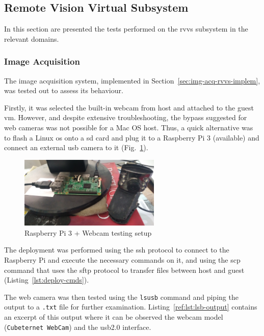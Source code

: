 \subsection{Remote Vision Virtual Subsystem}%
\label{sec:remote-visi-subsyst-testing}
In this section are presented the tests performed on the \gls{rvvs} subsystem in
the relevant domains.
%
\subsubsection{Image Acquisition}%
\label{sec:img-acq-rvvs-test}
The image acquisition system, implemented in
Section~\ref{sec:img-acq-rvvs-implem}, was tested out to assess its behaviour.

Firstly, it was selected the built-in webcam from host and attached to the guest
\gls{vm}. However,
and despite extensive troubleshooting, the bypass suggested for web
cameras\cite{webcam-bypass} was not possible for a Mac OS host. Thus, a quick
alternative was to flash a Linux \gls{os} onto a \gls{sd} card and plug it to a
Raspberry Pi 3 (available) and connect an external \gls{usb} camera to it (Fig.~\ref{fig:rasp-cam-test}).
\begin{figure}[!hbt]
\centering
    \includegraphics[width=0.6\textwidth]{./img/rasp-cam-test.jpg}
  \caption{Raspberry Pi 3 + Webcam testing setup}%
\label{fig:rasp-cam-test}
\end{figure}
%

The deployment was performed using the \gls{ssh} protocol to connect to the
Raspberry Pi and execute the necessary commands on it, and using the \gls{scp}
command that uses the \gls{sftp} protocol to transfer files between host and
guest (Listing~\ref{lst:deploy-cmds}).
%

The web camera was then tested using the \texttt{lsusb} command and piping the
output to a \texttt{.txt} file for further
examination. Listing~\ref{ref:lst:lsb-output} contains an excerpt of this output
where it can be observed the
webcam model (\texttt{Cubeternet WebCam}) and the \gls{usb}2.0 interface.
%

